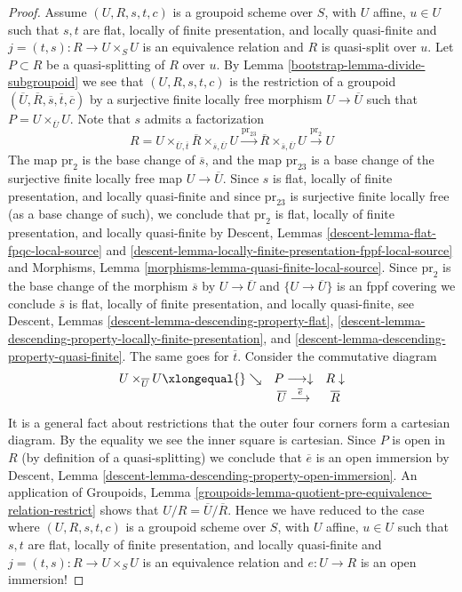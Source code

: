 \begin{proof}
\medskip\noindent
Assume $(U, R, s, t, c)$ is a groupoid scheme over $S$,
with $U$ affine, $u \in U$ such that $s, t$ are flat, locally
of finite presentation, and locally quasi-finite and
$j = (t, s) : R \to U \times_S U$ is an equivalence relation
and $R$ is quasi-split over $u$. Let $P \subset R$ be a quasi-splitting
of $R$ over $u$. By
Lemma \ref{bootstrap-lemma-divide-subgroupoid}
we see that $(U, R, s, t, c)$ is the restriction of a groupoid
$(\overline{U}, \overline{R}, \overline{s}, \overline{t}, \overline{c})$
by a surjective finite locally free morphism $U \to \overline{U}$ such that
$P = U \times_{\overline{U}} U$. Note that $s$ admits a factorization
$$
R = U \times_{\overline{U}, \overline{t}} \overline{R}
\times_{\overline{s}, \overline{U}} U
\xrightarrow{\text{pr}_{23}}
\overline{R} \times_{\overline{s}, \overline{U}} U
\xrightarrow{\text{pr}_2} U
$$
The map $\text{pr}_2$ is the base change of $\overline{s}$, and
the map $\text{pr}_{23}$ is a base change of the surjective finite locally
free map $U \to \overline{U}$. Since $s$ is flat, locally
of finite presentation, and locally quasi-finite and since $\text{pr}_{23}$
is surjective finite locally free (as a base change of such), we
conclude that $\text{pr}_2$ is flat, locally
of finite presentation, and locally quasi-finite by
Descent, Lemmas
\ref{descent-lemma-flat-fpqc-local-source} and
\ref{descent-lemma-locally-finite-presentation-fppf-local-source} and
Morphisms, Lemma \ref{morphisms-lemma-quasi-finite-local-source}.
Since $\text{pr}_2$ is the base change of the morphism
$\overline{s}$ by $U \to \overline{U}$ and $\{U \to \overline{U}\}$
is an fppf covering we conclude $\overline{s}$ is
flat, locally of finite presentation, and locally quasi-finite, see
Descent, Lemmas \ref{descent-lemma-descending-property-flat},
\ref{descent-lemma-descending-property-locally-finite-presentation}, and
\ref{descent-lemma-descending-property-quasi-finite}. The same goes
for $\overline{t}$. Consider the commutative diagram
$$
\begin{array}{ccc}U \times_{\overline{U}} U \xlongequal{}\searrow & P \longrightarrow\downarrow & R \downarrow \\  & \overline{U} \overset{\overline{e}}{\longrightarrow} & \overline{R}\end{array}
$$
It is a general fact about restrictions that the outer four corners
form a cartesian diagram. By the equality we see the inner square is
cartesian. Since $P$ is open in $R$ (by definition of a quasi-splitting)
we conclude that $\overline{e}$ is an open immersion by
Descent, Lemma \ref{descent-lemma-descending-property-open-immersion}.
An application of
Groupoids,
Lemma \ref{groupoids-lemma-quotient-pre-equivalence-relation-restrict}
shows that $U/R = \overline{U}/\overline{R}$. Hence we have reduced to
the case where $(U, R, s, t, c)$ is a groupoid scheme over $S$,
with $U$ affine, $u \in U$ such that $s, t$ are flat, locally
of finite presentation, and locally quasi-finite and
$j = (t, s) : R \to U \times_S U$ is an equivalence relation
and $e : U \to R$ is an open immersion!


\end{proof}
